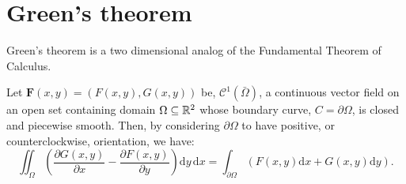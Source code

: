 
\section{Green's theorem} %
\label{sec:greenstheorem}

Green's theorem is a two dimensional analog of the
Fundamental Theorem of Calculus.

\begin{thm}
	Let $\mathbf{F}(x,y) = \left( F(x,y), G(x,y) \right)$ be,
	$\mathcal{C}^1(\bar{\Omega})$, a continuous vector field on an
	open set containing domain $\Omega \subseteq \mathbb{R}^2$ whose boundary
	curve, $C = \partial \Omega$, is closed and piecewise smooth.
	Then, by considering $\partial \Omega$ to have positive,
	or counterclockwise, orientation, we have:
	\[
		\iint_{\Omega} \left(
		\frac{\partial G(x,y)}{\partial x} - \frac{\partial F(x,y)}{\partial y}
		\right) \mathrm{d}y \, \mathrm{d}x =
		\int_{\partial \Omega} \left( F(x,y) \mathrm{d}x + G(x,y) \mathrm{d}y \right).
	\]
\end{thm}

